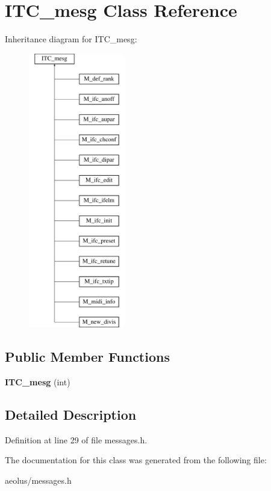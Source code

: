 \hypertarget{class_i_t_c__mesg}{}\section{I\+T\+C\+\_\+mesg Class Reference}
\label{class_i_t_c__mesg}
Inheritance diagram for I\+T\+C\+\_\+mesg\+:\begin{figure}[H]
\begin{center}
\leavevmode
\includegraphics[height=12.000000cm]{class_i_t_c__mesg}
\end{center}
\end{figure}
\subsection*{Public Member Functions}
\begin{DoxyCompactItemize}
\item 
\mbox{\label{class_i_t_c__mesg_a94a2674a9f93b00d3e77c0415c25654a}} 
{\bfseries I\+T\+C\+\_\+mesg} (int)
\end{DoxyCompactItemize}


\subsection{Detailed Description}


Definition at line 29 of file messages.\+h.



The documentation for this class was generated from the following file\+:\begin{DoxyCompactItemize}
\item 
aeolus/messages.\+h\end{DoxyCompactItemize}
